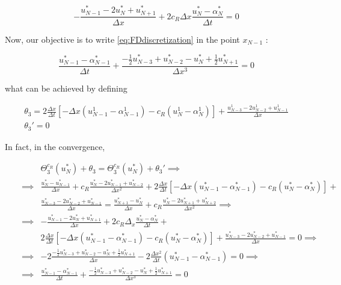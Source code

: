 \begin{equation}
-\frac{u_{N-1}^* - 2 u_{N}^* + u_{N+1}^*}{\Delta x} + 2c_R\Delta x\frac{u_N^* - \alpha_N^*}{\Delta t} = 0 
\end{equation}

\indent Now, our objective is to write \eqref{eq:FDdiscretization} in the point $x_{N-1}$ :

\begin{equation}
    \label{eq:FDdiscretizationNm1}
    \frac{u_{N-1}^* - \alpha_{N-1}^*}{\Delta t} + \frac{-\frac{1}{2}u_{N-3}^* + u_{N-2}^* - u_{N}^* + \frac{1}{2}u_{N+1}^* }{\Delta x ^3} = 0
\end{equation}

\noindent what can be achieved by defining

\begin{equation}
\begin{gathered}
    \theta_3 = 2\frac{\Delta x}{\Delta t} \left[-\Delta x(u_{N-1}^1 - \alpha_{N-1}^1) - c_R (u_N^1 - \alpha_N^1) \right] + \frac{u_{N-3}^1 - 2u_{N-2}^1 + u_{N-1}^1}{\Delta x} \\
    \theta_3' = 0
\end{gathered}
\end{equation}

\indent In fact, in the convergence,

\begin{align*}
\label{eq:modifiedTBC3}
&&  &\Theta_3^{c_R}(u_N^*) + \theta_3 = \Theta_3^{c_R}(u_N^*) + \theta_3'     \implies \\
&& \implies & \frac{u_N^* - u_{N-1}^*}{\Delta x} + c_R \frac{u_N^* - 2u_{N-1}^* + u_{N-2}^*}{\Delta x^2} + 2\frac{\Delta x}{\Delta t}  \left[-\Delta x(u_{N-1}^* - \alpha_{N-1}^*) - c_R (u_N^* - \alpha_N^*) \right] + \\
&&   & 			\frac{u_{N-3}^* - 2u_{N-2}^* + u_{N-1}^*}{\Delta x}  =  \frac{u_{N+1}^* - u_{N}^*}{\Delta x} + c_R \frac{u_N^* - 2u_{N+1}^* + u_{N+2}^*}{\Delta x^2} \implies \\
&&  \implies &  -\frac{u_{N-1}^* - 2 u_{N}^* + u_{N+1}^*}{\Delta x} + 2c_R\Delta_x\frac{u_N^* - \alpha_N^*}{\Delta t} + \\
&&   & 2\frac{\Delta x}{\Delta t} \left[-\Delta x(u_{N-1}^* - \alpha_{N-1}^*) - c_R(u_N^* - \alpha_N^*) \right] + \frac{u_{N-3}^* - 2u_{N-2}^* + u_{N-1}^*}{\Delta x} = 0 \implies \\
&& \implies  & -2\frac{-\frac{1}{2}u_{N-3}^* + u_{N-2}^* - u_{N}^* + \frac{1}{2}u_{N+1}^* }{\Delta x} - 2\frac{\Delta x^2}{\Delta t}(u_{N-1}^* - 					\alpha_{N-1}^*) = 0 \implies \\
&& \implies &  \frac{u_{N-1}^* - \alpha_{N-1}^*}{\Delta t} + \frac{-\frac{1}{2}u_{N-3}^* + u_{N-2}^* - u_{N}^* + \frac{1}{2}u_{N+1}^* }{\Delta x ^3} = 0
\end{align*}

